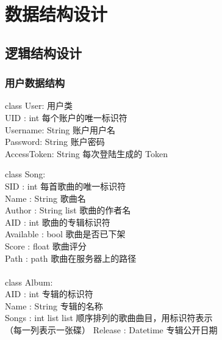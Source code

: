 \chapter{数据结构设计}
\section{逻辑结构设计}
\subsection{用户数据结构}

class User:             用户类\\
\indent \indent    UID : int           每个账户的唯一标识符\\
\indent \indent    Username: String    账户用户名\\
\indent \indent    Password: String    账户密码\\
\indent \indent    AccessToken: String 每次登陆生成的 Token


class Song:\\
\indent \indent   SID : int           每首歌曲的唯一标识符\\
\indent \indent   Name : String       歌曲名\\
\indent \indent   Author : String list 歌曲的作者名\\
\indent \indent   AID : int           歌曲的专辑标识符\\
\indent \indent   Available : bool    歌曲是否已下架\\
\indent \indent   Score : float       歌曲评分\\
\indent \indent   Path : path   歌曲在服务器上的路径\\
\\
class Album:\\
\indent \indent    AID : int           专辑的标识符\\
\indent \indent    Name : String       专辑的名称\\
\indent \indent    Songs : int list list   顺序排列的歌曲曲目，用标识符表示\\
\indent \indent                            （每一列表示一张碟）
\indent \indent    Release : Datetime  专辑公开日期

